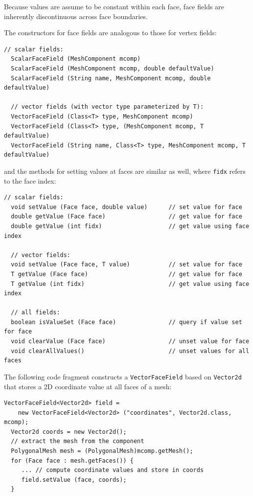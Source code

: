 \begin{sideblock}
Because values are assume to be constant within each face, face fields
are inherently discontinuous across face boundaries.
\end{sideblock}

The constructors for face fields are analogous to those
for vertex fields:
%
\begin{lstlisting}[]
  // scalar fields:
  ScalarFaceField (MeshComponent mcomp)
  ScalarFaceField (MeshComponent mcomp, double defaultValue)
  ScalarFaceField (String name, MeshComponent mcomp, double defaultValue)

  // vector fields (with vector type parameterized by T):
  VectorFaceField (Class<T> type, MeshComponent mcomp)
  VectorFaceField (Class<T> type, (MeshComponent mcomp, T defaultValue)
  VectorFaceField (String name, Class<T> type, MeshComponent mcomp, T defaultValue)
\end{lstlisting}
%
and the methods for setting values at faces are similar as
well, where {\tt fidx} refers to the face index:
%
\begin{lstlisting}[]
  // scalar fields:
  void setValue (Face face, double value)      // set value for face
  double getValue (Face face)                  // get value for face
  double getValue (int fidx)                   // get value using face index

  // vector fields:
  void setValue (Face face, T value)           // set value for face
  T getValue (Face face)                       // get value for face
  T getValue (int fidx)                        // get value using face index

  // all fields:
  boolean isValueSet (Face face)               // query if value set for face
  void clearValue (Face face)                  // unset value for face
  void clearAllValues()                        // unset values for all faces
\end{lstlisting}
%

The following code fragment constructs a {\tt VectorFaceField} based
on {\tt Vector2d} that stores a 2D coordinate value at all faces
of a mesh:
%
\begin{lstlisting}[]
  VectorFaceField<Vector2d> field =
    new VectorFaceField<Vector2d> ("coordinates", Vector2d.class, mcomp);
  Vector2d coords = new Vector2d();
  // extract the mesh from the component
  PolygonalMesh mesh = (PolygonalMesh)mcomp.getMesh();
  for (Face face : mesh.getFaces()) {
     ... // compute coordinate values and store in coords
     field.setValue (face, coords);
  }
\end{lstlisting}
%

